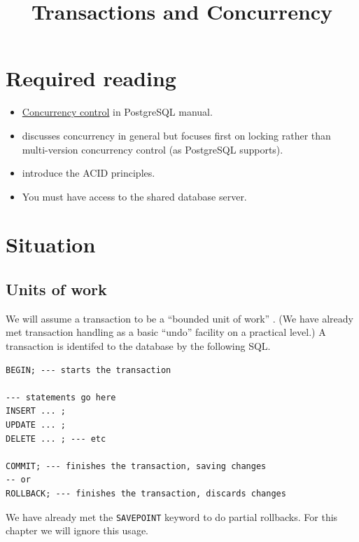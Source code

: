 \documentclass{pgnotes}
\title{Transactions and Concurrency}
\begin{document}
\maketitle

\section*{Required reading}

\begin{itemize}
\item \href{https://www.postgresql.org/docs/13/mvcc.html}{Concurrency control} in PostgreSQL manual.
\item \citep[Chapter 22]{connolly:2015:database} discusses concurrency in general but focuses first on locking rather than multi-version concurrency control (as PostgreSQL supports).
\item \citep{haerder:1983:principles} introduce the ACID principles.
\item You must have access to the shared database server.
\end{itemize}

\tableofcontents

\section{Situation}

\subsection{Units of work}

We will assume a transaction to be a ``bounded unit of work'' \citep{fowler:2003:patterns}.
(We have already met transaction handling as a basic ``undo'' facility on a practical level.) 
A transaction is identifed to the database by the following SQL. 

\begin{verbatim}
BEGIN; --- starts the transaction

--- statements go here
INSERT ... ;
UPDATE ... ;
DELETE ... ; --- etc

COMMIT; --- finishes the transaction, saving changes
-- or
ROLLBACK; --- finishes the transaction, discards changes
\end{verbatim}

We have already met the \texttt{SAVEPOINT} keyword to do partial rollbacks.
For this chapter we will ignore this usage.
\end{document}
